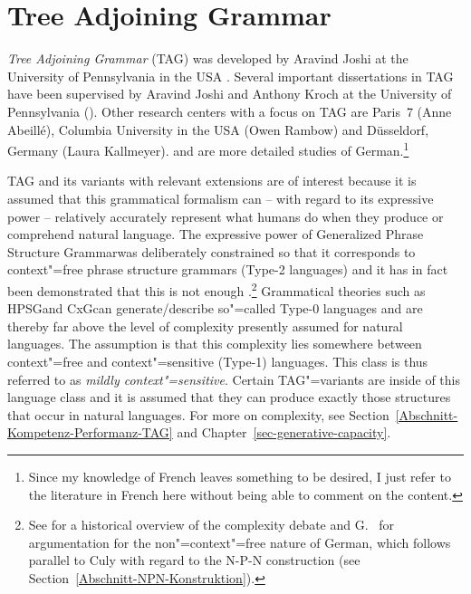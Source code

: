 
\chapter{Tree Adjoining Grammar}
\label{Kapitel-TAG}

\newcommand{\dotted}[0]{\makedash{2pt}}
\newcommand{\g}[1]{{\footnotesize $#1$}}


\emph{Tree Adjoining Grammar} (TAG)
was developed by Aravind Joshi at the University of Pennsylvania in the USA \citep*{JLT75a-u}. 
Several important dissertations in TAG have been supervised by Aravind
Joshi and Anthony Kroch at the University of Pennsylvania (\eg \citealp{Rambow94a}).
Other research centers with a focus on TAG are Paris~7 (Anne Abeill\'{e}), Columbia University in the USA
(Owen Rambow) and Düsseldorf, Germany (Laura Kallmeyer).
 and  are more detailed studies of German.\footnote{%
	Since my knowledge of French leaves something to be desired, I just refer to the literature in French here without being
	able to comment on the content.%
}

TAG and its variants with relevant extensions are of interest because it is assumed that this grammatical formalism can -- with regard to its
expressive power -- relatively accurately represent what humans do when they produce or comprehend natural language.
The expressive power of Generalized Phrase Structure Grammar\indexgpsg was deliberately constrained so that it corresponds to context"=free
phrase structure grammars (Type-2 languages) and it has in fact been demonstrated that this is not enough \citep{Shieber85a,Culy85a}.\footnote{%
	See \citet{Pullum86a} for a historical overview of the complexity debate and G.\  for argumentation for the non"=context"=free nature
	of German, which follows parallel to  Culy with regard to the N-P-N construction (see Section~\ref{Abschnitt-NPN-Konstruktion}).%
	} Grammatical theories such as HPSG\indexhpsg and CxG\indexcxg can generate/describe so"=called Type-0 languages and are thereby far above the level
	of complexity presently assumed for natural languages. 
The assumption is that this complexity lies somewhere between context"=free
and context"=sensitive (Type-1) languages. This class is thus referred to as \emph{mildly context"=sensitive}.
Certain TAG"=variants are inside of this language class and it is assumed that they can produce exactly those structures that occur in
natural languages. For more on complexity, see Section~\ref{Abschnitt-Kompetenz-Performanz-TAG} and Chapter~\ref{sec-generative-capacity}.

